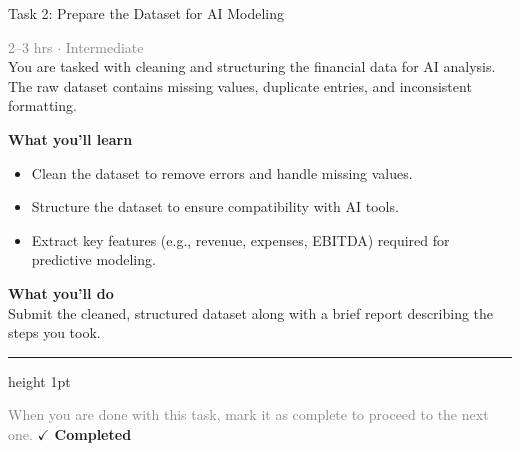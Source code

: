 \documentclass[10pt,a4paper]{article}
\begin{document}
\begin{taskbox}{Task 2: Prepare the Dataset for AI Modeling}

    {\small \textcolor{gray}{2--3 hrs $\cdot$ Intermediate}}\\[12pt]

      
You are tasked with cleaning and structuring the financial data for AI analysis. The raw dataset contains missing values, duplicate entries, and inconsistent formatting.  


\vspace{8pt}
{\large \textbf{\textcolor{brandLight}{What you'll learn}}}\\[4pt]  
\begin{itemize}
    \item Clean the dataset to remove errors and handle missing values.  
    \item Structure the dataset to ensure compatibility with AI tools.  
    \item Extract key features (e.g., revenue, expenses, EBITDA) required for predictive modeling.  
\end{itemize}

\vspace{8pt}
{\large \textbf{\textcolor{brandLight}{What you'll do}}}\\[4pt]  
Submit the cleaned, structured dataset along with a brief report describing the steps you took.\par

    \vspace{16pt}

    \textcolor{cardBorder}{\hrule height 1pt}\vspace{8pt}

    \small \textcolor{gray}{When you are done with this task, mark it as complete to proceed to the next one.} \hfill \textbf{\textcolor{brandDark}{$\checkmark$ Completed}}

\end{taskbox}
\end{document}
